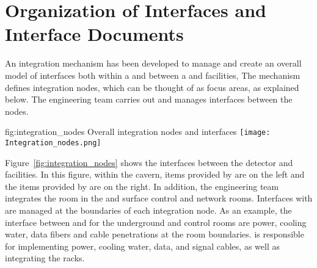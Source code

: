 \section{Organization of Interfaces and Interface Documents}
\label{sec:fdsp-coord-integ-interface}

An integration mechanism has been developed to manage and create an
overall model of interfaces both within a  and
between a  and facilities, The mechanism defines
integration nodes, which can be thought of as focus areas, as
explained below.  The  engineering team carries out and
manages interfaces between the nodes.
\begin{dunefigure}{fig:integration_nodes}
  {Overall integration nodes and interfaces}
  \texttt{[image: Integration\_nodes.png]}
\end{dunefigure}

Figure~\ref{fig:integration_nodes} shows the interfaces between the
detector and facilities. In this figure, within the cavern, items
provided by  are on the left and the items provided by
 are on the right. In addition, the  engineering
team integrates the  room in the  and
surface control and network rooms.  Interfaces with  are
managed at the boundaries of each integration node. As an example, the
interface between  and  for the underground
 and control rooms are power, cooling water, data fibers
and cable penetrations at the room boundaries.  is responsible 
for implementing power,
cooling water, data, and signal cables, as well as integrating the
racks. %


